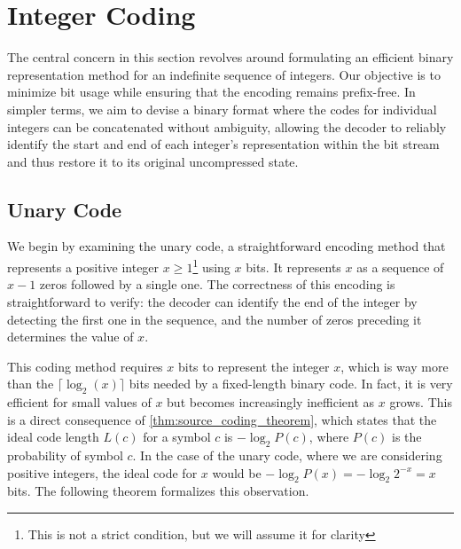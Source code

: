 \clearpage
\section{Integer Coding} \label{sec:integer_coding}

 \vspace{0.4cm}

\noindent The central concern in this section revolves around formulating an efficient binary representation method for an indefinite sequence of integers. Our objective is to minimize bit usage while ensuring that the encoding remains prefix-free. In simpler terms, we aim to devise a binary format where the codes for individual integers can be concatenated without ambiguity, allowing the decoder to reliably identify the start and end of each integer's representation within the bit stream and thus restore it to its original uncompressed state.

\subsection{Unary Code}
We begin by examining the unary code, a straightforward encoding method that represents a positive integer $x \geq 1$\footnote{This is not a strict condition, but we will assume it for clarity} using $x$ bits. It represents $x$ as a sequence of $x-1$ zeros followed by a single one. The correctness of this encoding is straightforward to verify: the decoder can identify the end of the integer by detecting the first one in the sequence, and the number of zeros preceding it determines the value of $x$. \vspace{0.4cm}

\noindent This coding method requires $x$ bits to represent the integer $x$, which is way more than the $\lceil\log_2(x)\rceil$ bits needed by a fixed-length binary code. In fact, it is very efficient for small values of $x$ but becomes increasingly inefficient as $x$ grows. This is a direct consequence of \autoref{thm:source_coding_theorem}, which states that the ideal code length $L(c)$ for a symbol $c$ is $-\log_2 P(c)$, where $P(c)$ is the probability of symbol $c$. In the case of the unary code, where we are considering positive integers, the ideal code for $x$ would be $-\log_2 P(x) = -\log_2 2^{-x} = x$ bits. The following theorem formalizes this observation. \cite{ferragina2023pearls}

